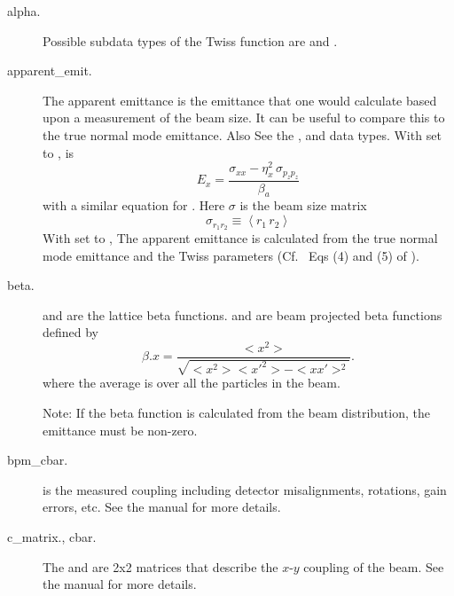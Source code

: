   \begin{description}

  \item[alpha.] \Newline
Possible subdata types of the Twiss function  are  and .

  \item[apparent_emit.] \Newline
The apparent emittance is the emittance that one would calculate based
upon a measurement of the beam size\cite{b:emit}. It can be useful to
compare this to the true normal mode emittance. Also See the
,  and  data types.
With  set to ,  is
\begin{equation}
  E_x = \frac{\sigma_{xx} - \eta_x^2 \, \sigma_{p_zp_z}}{\beta_a}
\end{equation}
with a similar equation for . Here $\sigma$ is the beam size matrix
\begin{equation}
  \sigma_{r_1r_2} \equiv \left< r_1 \, r_2 \right>
\end{equation}
With  set to , The apparent emittance is
calculated from the true normal mode emittance and the Twiss
parameters (Cf.~ Eqs (4) and (5) of \cite{b:emit}).

  \item[beta.] \Newline
{} and  are the lattice beta functions.  and
 are beam projected beta functions defined by
\begin{equation}
  \beta.x = \frac{<x^{2}>}{\sqrt{<x^{2}> <x'^{2}> - <x x'>^{2}}}.
\end{equation}
where the average \vn{<>} is over all the particles in the beam.

Note: If the beta function is calculated from the beam distribution,
the emittance must be non-zero.

  \item[bpm_cbar.]
 is the measured coupling including detector misalignments, rotations, gain errors, etc.
See the \bmad manual for more details.

  \item[c_matrix., cbar.]
The  and  are 2x2 matrices that describe the $x$-$y$ coupling of the beam.
See the \bmad manual for more details.


\end{description}
